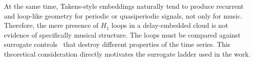 At the same time, Takens-style embeddings naturally tend to produce recurrent and loop-like geometry for periodic or quasiperiodic signals, not only for music. Therefore, the mere presence of $H_1$ loops in a delay-embedded cloud is not evidence of specifically musical structure. The loops must be compared against surrogate controls~\cite{schreiber1996improved} that destroy different properties of the time series. This theoretical consideration directly motivates the surrogate ladder used in the work.
